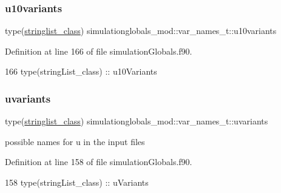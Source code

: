 \subsubsection{\texorpdfstring{u10variants}{u10variants}}
{\footnotesize\ttfamily type(\mbox{\hyperlink{structsimulationglobals__mod_1_1stringlist__class}{stringlist\+\_\+class}}) simulationglobals\+\_\+mod\+::var\+\_\+names\+\_\+t\+::u10variants\hspace{0.3cm}{\ttfamily [private]}}



Definition at line 166 of file simulation\+Globals.\+f90.


\begin{DoxyCode}
166         \textcolor{keywordtype}{type}(stringList\_class) :: u10Variants
\end{DoxyCode}
\mbox{\label{structsimulationglobals__mod_1_1var__names__t_a4a7350ba83ed451757bc06279a3ba337}} 
\subsubsection{\texorpdfstring{uvariants}{uvariants}}
{\footnotesize\ttfamily type(\mbox{\hyperlink{structsimulationglobals__mod_1_1stringlist__class}{stringlist\+\_\+class}}) simulationglobals\+\_\+mod\+::var\+\_\+names\+\_\+t\+::uvariants\hspace{0.3cm}{\ttfamily [private]}}



possible names for \textquotesingle{}u\textquotesingle{} in the input files 



Definition at line 158 of file simulation\+Globals.\+f90.


\begin{DoxyCode}
158         \textcolor{keywordtype}{type}(stringList\_class) :: uVariants
\end{DoxyCode}
\mbox{\label{structsimulationglobals__mod_1_1var__names__t_a037c76a1788e918a911686b1a357b63c}} 
